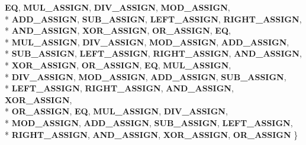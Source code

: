 \begin{DoxyCompactItemize}
{\bfseries E\-Q}, 
{\bfseries M\-U\-L\-\_\-\-A\-S\-S\-I\-G\-N}, 
{\bfseries D\-I\-V\-\_\-\-A\-S\-S\-I\-G\-N}, 
{\bfseries M\-O\-D\-\_\-\-A\-S\-S\-I\-G\-N}, 
\\*
{\bfseries A\-D\-D\-\_\-\-A\-S\-S\-I\-G\-N}, 
{\bfseries S\-U\-B\-\_\-\-A\-S\-S\-I\-G\-N}, 
{\bfseries L\-E\-F\-T\-\_\-\-A\-S\-S\-I\-G\-N}, 
{\bfseries R\-I\-G\-H\-T\-\_\-\-A\-S\-S\-I\-G\-N}, 
\\*
{\bfseries A\-N\-D\-\_\-\-A\-S\-S\-I\-G\-N}, 
{\bfseries X\-O\-R\-\_\-\-A\-S\-S\-I\-G\-N}, 
{\bfseries O\-R\-\_\-\-A\-S\-S\-I\-G\-N}, 
{\bfseries E\-Q}, 
\\*
{\bfseries M\-U\-L\-\_\-\-A\-S\-S\-I\-G\-N}, 
{\bfseries D\-I\-V\-\_\-\-A\-S\-S\-I\-G\-N}, 
{\bfseries M\-O\-D\-\_\-\-A\-S\-S\-I\-G\-N}, 
{\bfseries A\-D\-D\-\_\-\-A\-S\-S\-I\-G\-N}, 
\\*
{\bfseries S\-U\-B\-\_\-\-A\-S\-S\-I\-G\-N}, 
{\bfseries L\-E\-F\-T\-\_\-\-A\-S\-S\-I\-G\-N}, 
{\bfseries R\-I\-G\-H\-T\-\_\-\-A\-S\-S\-I\-G\-N}, 
{\bfseries A\-N\-D\-\_\-\-A\-S\-S\-I\-G\-N}, 
\\*
{\bfseries X\-O\-R\-\_\-\-A\-S\-S\-I\-G\-N}, 
{\bfseries O\-R\-\_\-\-A\-S\-S\-I\-G\-N}, 
{\bfseries E\-Q}, 
{\bfseries M\-U\-L\-\_\-\-A\-S\-S\-I\-G\-N}, 
\\*
{\bfseries D\-I\-V\-\_\-\-A\-S\-S\-I\-G\-N}, 
{\bfseries M\-O\-D\-\_\-\-A\-S\-S\-I\-G\-N}, 
{\bfseries A\-D\-D\-\_\-\-A\-S\-S\-I\-G\-N}, 
{\bfseries S\-U\-B\-\_\-\-A\-S\-S\-I\-G\-N}, 
\\*
{\bfseries L\-E\-F\-T\-\_\-\-A\-S\-S\-I\-G\-N}, 
{\bfseries R\-I\-G\-H\-T\-\_\-\-A\-S\-S\-I\-G\-N}, 
{\bfseries A\-N\-D\-\_\-\-A\-S\-S\-I\-G\-N}, 
{\bfseries X\-O\-R\-\_\-\-A\-S\-S\-I\-G\-N}, 
\\*
{\bfseries O\-R\-\_\-\-A\-S\-S\-I\-G\-N}, 
{\bfseries E\-Q}, 
{\bfseries M\-U\-L\-\_\-\-A\-S\-S\-I\-G\-N}, 
{\bfseries D\-I\-V\-\_\-\-A\-S\-S\-I\-G\-N}, 
\\*
{\bfseries M\-O\-D\-\_\-\-A\-S\-S\-I\-G\-N}, 
{\bfseries A\-D\-D\-\_\-\-A\-S\-S\-I\-G\-N}, 
{\bfseries S\-U\-B\-\_\-\-A\-S\-S\-I\-G\-N}, 
{\bfseries L\-E\-F\-T\-\_\-\-A\-S\-S\-I\-G\-N}, 
\\*
{\bfseries R\-I\-G\-H\-T\-\_\-\-A\-S\-S\-I\-G\-N}, 
{\bfseries A\-N\-D\-\_\-\-A\-S\-S\-I\-G\-N}, 
{\bfseries X\-O\-R\-\_\-\-A\-S\-S\-I\-G\-N}, 
{\bfseries O\-R\-\_\-\-A\-S\-S\-I\-G\-N}
 \}
\end{DoxyCompactItemize}
